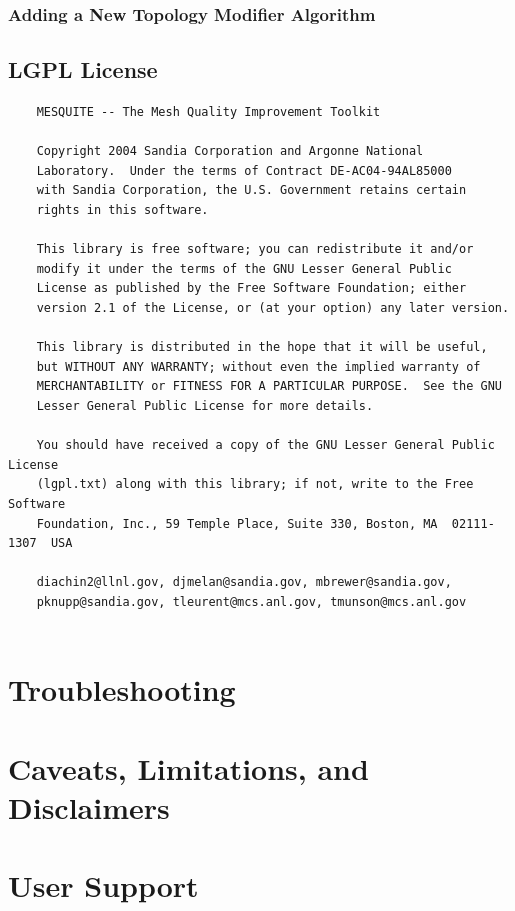 \documentclass[letter]{report}
\begin{document}
\subsection{Adding a New Topology Modifier Algorithm}

\section{LGPL License}
\begin{verbatim}
    MESQUITE -- The Mesh Quality Improvement Toolkit
 
    Copyright 2004 Sandia Corporation and Argonne National
    Laboratory.  Under the terms of Contract DE-AC04-94AL85000
    with Sandia Corporation, the U.S. Government retains certain
    rights in this software.
 
    This library is free software; you can redistribute it and/or
    modify it under the terms of the GNU Lesser General Public
    License as published by the Free Software Foundation; either
    version 2.1 of the License, or (at your option) any later version.
 
    This library is distributed in the hope that it will be useful,
    but WITHOUT ANY WARRANTY; without even the implied warranty of
    MERCHANTABILITY or FITNESS FOR A PARTICULAR PURPOSE.  See the GNU
    Lesser General Public License for more details.
 
    You should have received a copy of the GNU Lesser General Public License
    (lgpl.txt) along with this library; if not, write to the Free Software
    Foundation, Inc., 59 Temple Place, Suite 330, Boston, MA  02111-1307  USA
  
    diachin2@llnl.gov, djmelan@sandia.gov, mbrewer@sandia.gov,
    pknupp@sandia.gov, tleurent@mcs.anl.gov, tmunson@mcs.anl.gov
    
\end{verbatim}


\chapter{Troubleshooting}

\chapter{Caveats, Limitations, and Disclaimers}

\chapter{User Support}
\end{document}
